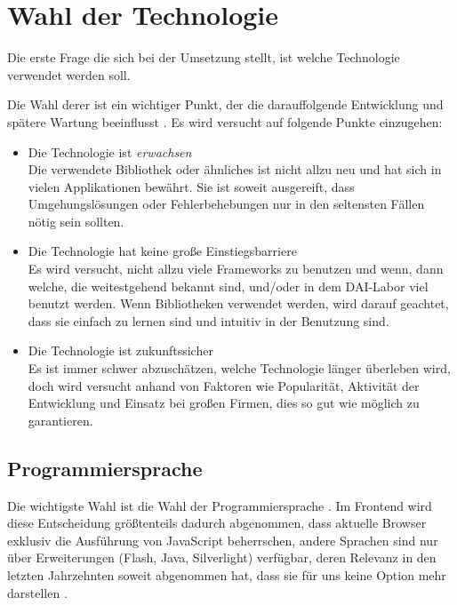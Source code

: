 \documentclass[12pt,twoside]{book}
\begin{document}
\section{Wahl der Technologie}

Die erste Frage die sich bei der Umsetzung stellt, ist welche Technologie verwendet werden soll.

Die Wahl derer ist ein wichtiger Punkt, der die darauffolgende Entwicklung und spätere Wartung beeinflusst \cite{graham2004beating}. Es wird versucht auf folgende Punkte einzugehen:

\begin{itemize}
  \item Die Technologie ist \textit{erwachsen} \\
  Die verwendete Bibliothek oder ähnliches ist nicht allzu neu und hat sich in vielen Applikationen bewährt. Sie ist soweit ausgereift, dass Umgehungslösungen oder Fehlerbehebungen nur in den seltensten Fällen nötig sein sollten.
  \item Die Technologie hat keine große Einstiegsbarriere \\
  Es wird versucht, nicht allzu viele Frameworks zu benutzen und wenn, dann welche, die weitestgehend bekannt sind, und/oder in dem DAI-Labor viel benutzt werden. Wenn Bibliotheken verwendet werden, wird darauf geachtet, dass sie einfach zu lernen sind und intuitiv in der Benutzung sind.
  \item Die Technologie ist zukunftssicher \\
  Es ist immer schwer abzuschätzen, welche Technologie länger überleben wird, doch wird versucht anhand von Faktoren wie Popularität, Aktivität der Entwicklung und Einsatz bei großen Firmen, dies so gut wie möglich zu garantieren.
\end{itemize}

\subsection{Programmiersprache}

Die wichtigste Wahl ist die Wahl der Programmiersprache \cite{graham2004beating}. Im Frontend wird diese Entscheidung größtenteils dadurch abgenommen, dass aktuelle Browser exklusiv die Ausführung von JavaScript beherrschen, andere Sprachen sind nur über Erweiterungen (Flash, Java, Silverlight) verfügbar, deren Relevanz in den letzten Jahrzehnten soweit abgenommen hat, dass sie für uns keine Option mehr darstellen \cite{clientside}.
\end{document}
